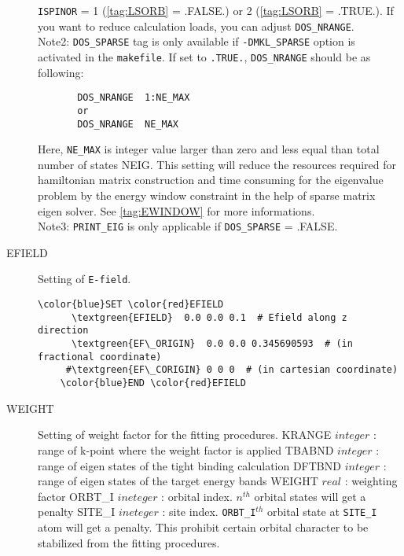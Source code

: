 \documentclass[a4paper,12pt]{scrartcl}
\makeatletter
\def\namedlabel#1#2{\begingroup
    #2%
    \def\@currentlabel{#2}%
    \phantomsection\label{#1}\endgroup
}
\newcommand{\textblue}[1]{\textcolor{blue!85!white}{\texttt{#1}}}
\newcommand{\textgreen}[1]{\textcolor{green!50!black}{\texttt{#1}}}
\makeatother
\begin{document}
\begin{description}
\texttt{ISPINOR} = 1 (\ref{tag:LSORB} = .FALSE.) or 2 (\ref{tag:LSORB} = .TRUE.).
If you want to reduce calculation loads, you can adjust \texttt{DOS\_NRANGE}. \\
Note2: \texttt{DOS\_SPARSE} tag is only available if 
    \textblue{-DMKL\_SPARSE} option is activated in the \texttt{makefile}. 
    If set to \texttt{.TRUE.}, \texttt{DOS\_NRANGE}
    should be as following:
     \begin{verbatim}
       DOS_NRANGE  1:NE_MAX
       or
       DOS_NRANGE  NE_MAX
     \end{verbatim}
     Here, \texttt{NE\_MAX} is integer value larger
     than zero and less equal than total number of 
     states NEIG.
    This setting will reduce the resources
    required for hamiltonian matrix construction
    and time consuming for the eigenvalue problem
    by the energy window constraint in the help
    of sparse matrix eigen solver. 
    See \ref{tag:EWINDOW} for more informations. \\
Note3: \texttt{PRINT\_EIG} is only applicable if 
    \texttt{DOS\_SPARSE} = .FALSE.

    \item[\namedlabel{tag:EFIELD}{EFIELD}]
        Setting of \texttt{E-field}.

 \begin{Verbatim}[commandchars=\\\{\},gobble=4, frame=single, framesep=2mm, 
    label= EFIELD setup example,
    labelposition=bottomline]
    \color{blue}SET \color{red}EFIELD
      \textgreen{EFIELD}  0.0 0.0 0.1  # Efield along z direction
      \textgreen{EF\_ORIGIN}  0.0 0.0 0.345690593  # (in fractional coordinate)
     #\textgreen{EF\_CORIGIN} 0 0 0  # (in cartesian coordinate)
    \color{blue}END \color{red}EFIELD
 \end{Verbatim}


    \item[\namedlabel{tag:WEIGHT}{WEIGHT}] 
		Setting of weight factor for the fitting procedures.
		\subitem KRANGE $integer$ : range of k-point where the weight factor is applied 
		\subitem TBABND $integer$ : range of eigen states of the tight binding calculation 
		\subitem DFTBND $integer$ : range of eigen states of the target energy bands 
		\subitem WEIGHT $real$ : weighting factor 
		\subitem ORBT\_I $ineteger$ : orbital index. $n^{th}$ orbital states will get a penalty 
		\subitem SITE\_I $ineteger$ : site index. \texttt{ORBT\_I}$^{th}$  orbital state  
		at \texttt{SITE\_I} atom will get a penalty. This prohibit certain orbital character 
		to be stabilized from the fitting procedures.
		



\end{description}
\end{document}
